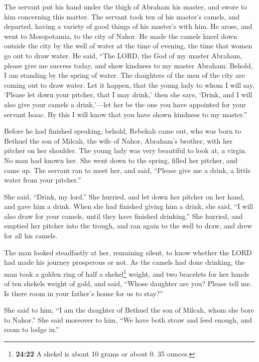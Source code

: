  The servant put his hand under the thigh of Abraham his
master, and swore to him concerning this matter.  The
servant took ten of his master's camels, and departed, having a variety
of good things of his master's with him. He arose, and went to
Mesopotamia, to the city of Nahor.  He made the camels
kneel down outside the city by the well of water at the time of evening,
the time that women go out to draw water.  He said, ``The
LORD, the God of my master Abraham, please give me success today, and
show kindness to my master Abraham.  Behold, I am
standing by the spring of water. The daughters of the men of the city
are coming out to draw water.  Let it happen, that the
young lady to whom I will say, `Please let down your pitcher, that I may
drink,' then she says, `Drink, and I will also give your camels a
drink,'---let her be the one you have appointed for your servant Isaac.
By this I will know that you have shown kindness to my master.''

 Before he had finished speaking, behold, Rebekah came
out, who was born to Bethuel the son of Milcah, the wife of Nahor,
Abraham's brother, with her pitcher on her shoulder.  The
young lady was very beautiful to look at, a virgin. No man had known
her. She went down to the spring, filled her pitcher, and came up.
 The servant ran to meet her, and said, ``Please give me
a drink, a little water from your pitcher.''

 She said, ``Drink, my lord.'' She hurried, and let down
her pitcher on her hand, and gave him a drink.  When she
had finished giving him a drink, she said, ``I will also draw for your
camels, until they have finished drinking.''  She
hurried, and emptied her pitcher into the trough, and ran again to the
well to draw, and drew for all his camels.

 The man looked steadfastly at her, remaining silent, to
know whether the LORD had made his journey prosperous or not.
 As the camels had done drinking, the man took a golden
ring of half a shekel\footnote{\textbf{24:22} A shekel is about 10 grams
  or about 0. 35 ounces.} weight, and two bracelets for her hands of ten
shekels weight of gold,  and said, ``Whose daughter are
you? Please tell me. Is there room in your father's house for us to
stay?''

 She said to him, ``I am the daughter of Bethuel the son
of Milcah, whom she bore to Nahor.''  She said moreover
to him, ``We have both straw and feed enough, and room to lodge in.''

